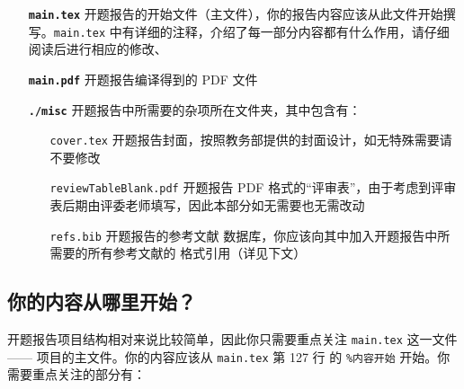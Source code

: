 \begin{itemize}
  \item[\color{RubineRed}\textbf{\texttt{main.tex}}] 开题报告的开始文件（主文件），你的报告内容应该从此文件开始撰写。\texttt{main.tex} 中有详细的注释，介绍了每一部分内容都有什么作用，请仔细阅读后进行相应的修改、
  \item[\color{RubineRed}\textbf{\texttt{main.pdf}}] 开题报告编译得到的 PDF 文件
  \item[\color{RubineRed}\textbf{\texttt{./misc}}] 开题报告中所需要的杂项所在文件夹，其中包含有：
  \begin{itemize}
    \item[\color{RoyalBlue}\texttt{cover.tex}] 开题报告封面，按照教务部提供的封面设计，如无特殊需要请不要修改
    \item[\color{RoyalBlue}\texttt{reviewTableBlank.pdf}] 开题报告 PDF 格式的“评审表”，由于考虑到评审表后期由评委老师填写，因此本部分如无需要也无需改动
    \item[\color{RoyalBlue}\texttt{refs.bib}] 开题报告的参考文献 {} 数据库，你应该向其中加入开题报告中所需要的所有参考文献的 {} 格式引用（详见下文）
  \end{itemize}
\end{itemize}

\subsection{你的内容从哪里开始？}
开题报告项目结构相对来说比较简单，因此你只需要重点关注 \texttt{main.tex} 这一文件 —— 项目的主文件。你的内容应该从 \texttt{main.tex} 第 127 行 的 \texttt{\%内容开始} 开始。你需要重点关注的部分有：

\begin{table}[H]
\centering
\caption{开题报告内容概要}
\label{tab:proposalreport}
\end{table}

